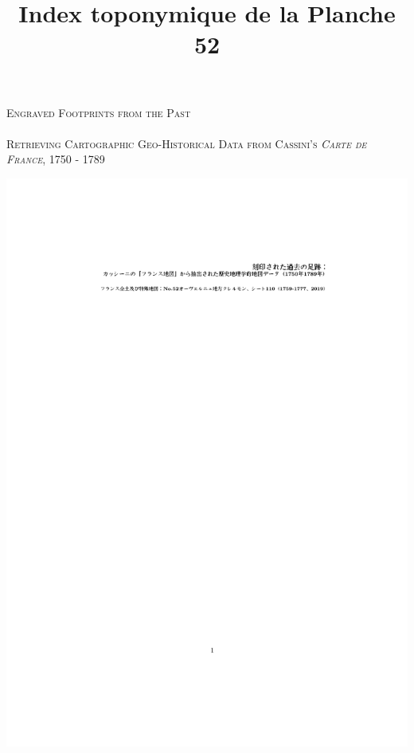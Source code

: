 \documentclass[portrait, A0]{sciposter}
\title{Index toponymique de la Planche 52}
\institute{EHESS}
\begin{document}
\bgroup
\setlength{\parindent}{-0.1em} 
\begin{minipage}[t]{0.6\textwidth}
  \Huge
  \textsc{Engraved Footprints from the Past}\\ \\
  \Large \textsc{Retrieving Cartographic Geo-Historical Data from Cassini’s \emph{Carte de France}, 1750 - 1789}
\end{minipage}
\begin{minipage}[t]{0.35\textwidth}
  \vspace*{-2.5cm}
  \includegraphics[width=\textwidth, trim= 5cm 26cm 4cm 22cm, clip]{gfx/jap.pdf}
\end{minipage}

\vspace{1cm}
\egroup
\end{document}
